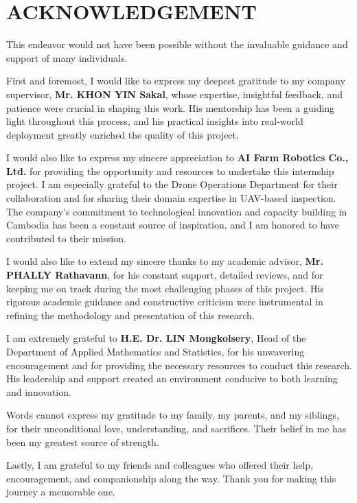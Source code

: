 \clearpage
{}
\chapter*{ACKNOWLEDGEMENT}

\hs This endeavor would not have been possible without the invaluable guidance and support of many individuals.

First and foremost, I would like to express my deepest gratitude to my company supervisor, \textbf{Mr. KHON YIN Sakal}, whose expertise, insightful feedback, and patience were crucial in shaping this work. His mentorship has been a guiding light throughout this process, and his practical insights into real-world deployment greatly enriched the quality of this project.

I would also like to express my sincere appreciation to \textbf{AI Farm Robotics Co., Ltd.} for providing the opportunity and resources to undertake this internship project. I am especially grateful to the Drone Operations Department for their collaboration and for sharing their domain expertise in UAV-based inspection. The company's commitment to technological innovation and capacity building in Cambodia has been a constant source of inspiration, and I am honored to have contributed to their mission.

I would also like to extend my sincere thanks to my academic advisor, \textbf{Mr. PHALLY Rathavann}, for his constant support, detailed reviews, and for keeping me on track during the most challenging phases of this project. His rigorous academic guidance and constructive criticism were instrumental in refining the methodology and presentation of this research.

I am extremely grateful to \textbf{H.E. Dr. LIN Mongkolsery}, Head of the Department of Applied Mathematics and Statistics, for his unwavering encouragement and for providing the necessary resources to conduct this research. His leadership and support created an environment conducive to both learning and innovation.

Words cannot express my gratitude to my family, my parents, and my siblings, for their unconditional love, understanding, and sacrifices. Their belief in me has been my greatest source of strength.

Lastly, I am grateful to my friends and colleagues who offered their help, encouragement, and companionship along the way. Thank you for making this journey a memorable one.